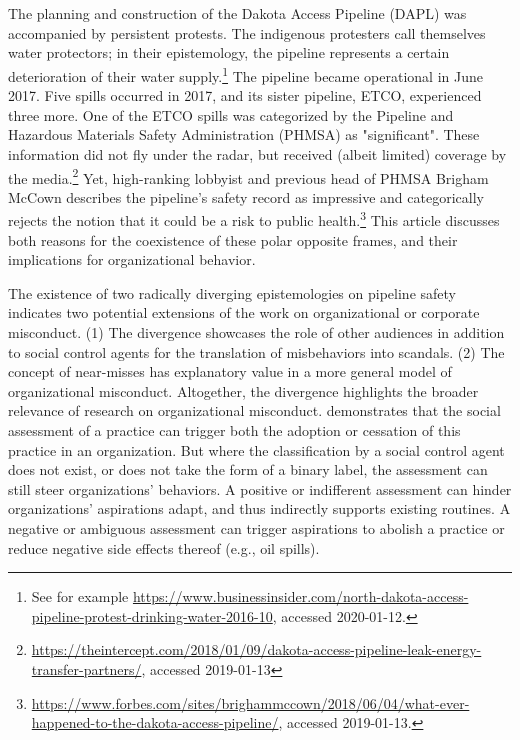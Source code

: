 \section{}

The planning and construction of the Dakota Access Pipeline (DAPL) was accompanied by persistent protests. The indigenous protesters call themselves water protectors; in their epistemology, the pipeline represents a certain deterioration of their water supply.\footnote{See for example \url{https://www.businessinsider.com/north-dakota-access-pipeline-protest-drinking-water-2016-10}, accessed 2020-01-12.} The pipeline became operational in June 2017. Five spills occurred in 2017, and its sister pipeline, ETCO, experienced three more. One of the ETCO spills was categorized by the Pipeline and Hazardous Materials Safety Administration (PHMSA) as "significant". These information did not fly under the radar, but received (albeit limited) coverage by the media.\footnote{\url{https://theintercept.com/2018/01/09/dakota-access-pipeline-leak-energy-transfer-partners/}, accessed 2019-01-13} Yet, high-ranking lobbyist and previous head of PHMSA Brigham McCown describes the pipeline's safety record as impressive and categorically rejects the notion that it could be a risk to public health.\footnote{\url{https://www.forbes.com/sites/brighammccown/2018/06/04/what-ever-happened-to-the-dakota-access-pipeline/}, accessed 2019-01-13.} This article discusses both reasons for the coexistence of these polar opposite frames, and their implications for organizational behavior.

The existence of two radically diverging epistemologies on pipeline safety indicates two potential extensions of the work on organizational or corporate misconduct. (1) The divergence showcases the role of other audiences in addition to social control agents \citep{Greve2010} for the translation of misbehaviors into scandals. (2) The concept of near-misses \citep{Carroll1998, Dillon2008} has explanatory value in a more general model of organizational misconduct. Altogether, the divergence highlights the broader relevance of research on organizational misconduct. \citet{Mohliver2019} demonstrates that the social assessment of a practice can trigger both the adoption or cessation of this practice in an organization. But where the classification by a social control agent does not exist, or does not take the form of a binary label, the assessment can still steer organizations' behaviors. A positive or indifferent assessment can hinder organizations' aspirations adapt, and thus indirectly supports existing routines. A negative or ambiguous assessment can trigger aspirations to abolish a practice or reduce negative side effects thereof (e.g., oil spills).

